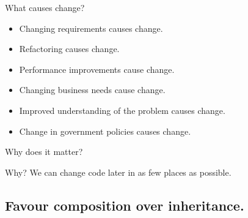 \documentclass{beamer}
\begin{document}
\begin{frame}{What causes change?}
    \begin{itemize}
        \item Changing requirements causes change.
        \item Refactoring causes change. 
        \item Performance improvements cause change. 
        \item Changing business needs cause change. 
        \item Improved understanding of the problem causes change. 
        \item Change in government policies causes change.
    \end{itemize}
\end{frame}

\begin{frame}{Why does it matter?}
    \par Why? We can change code later in as few places as possible.
\end{frame}

\begin{frame}{}
    
\end{frame}

\begin{frame}{}
    
\end{frame}

\begin{frame}{}
    
\end{frame}

\subsection{Favour composition over inheritance.}
\end{document}
